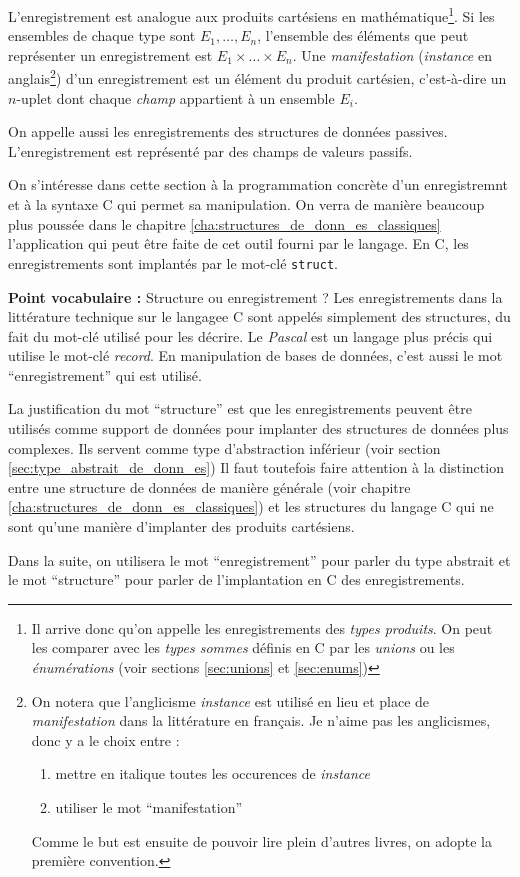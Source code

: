 \documentclass[../../../main.tex]{subfiles}
\begin{document}
L'enregistrement est analogue aux produits cartésiens en mathématique\footnote{Il arrive donc qu'on appelle les enregistrements des \textit{types produits}. On peut les comparer avec les \textit{types sommes} définis en C par les \textit{unions} ou les \textit{énumérations} (voir sections \ref{sec:unions} et \ref{sec:enums})}. Si les ensembles de chaque type sont $E_1, \dots, E_n$, l'ensemble des éléments que peut représenter un enregistrement est $E_1\times\dots\times E_n$. Une \textit{manifestation} (\textit{instance} en anglais\footnote{On notera que l'anglicisme \textit{instance} est utilisé en lieu et place de \textit{manifestation} dans la littérature en français. Je n'aime pas les anglicismes, donc y a le choix entre :
\begin{enumerate}
	\item mettre en italique toutes les occurences de \textit{instance}
	\item utiliser le mot ``manifestation''
\end{enumerate}
Comme le but est ensuite de pouvoir lire plein d'autres livres, on adopte la première convention.
}) d'un enregistrement est un élément du produit cartésien, c'est-à-dire un $n\text{-uplet}$ dont chaque \textit{champ} appartient à un ensemble $E_i$.

On appelle aussi les enregistrements des structures de données passives. L'enregistrement est représenté par des champs de valeurs passifs.

On s'intéresse dans cette section à la programmation concrète d'un enregistremnt et à la syntaxe C qui permet sa manipulation. On verra de manière beaucoup plus poussée dans le chapitre \ref{cha:structures_de_donn_es_classiques} l'application qui peut être faite de cet outil fourni par le langage. En C, les enregistrements sont implantés par le mot-clé \texttt{struct}.

\begin{minitelbasicbox}{\textbf{Point vocabulaire :} Structure ou enregistrement ?}
Les enregistrements dans la littérature technique sur le langagee C sont appelés simplement des structures, du fait du mot-clé utilisé pour les décrire. Le \textit{Pascal} est un langage plus précis qui utilise le mot-clé \textit{record}. En manipulation de bases de données, c'est aussi le mot ``enregistrement'' qui est utilisé.

La justification du mot ``structure'' est que les enregistrements peuvent être utilisés comme support de données pour implanter des structures de données plus complexes. Ils servent comme type d'abstraction inférieur (voir section \ref{sec:type_abstrait_de_donn_es}) Il faut toutefois faire attention à la distinction entre une structure de données de manière générale (voir chapitre \ref{cha:structures_de_donn_es_classiques}) et les structures du langage C qui ne sont qu'une manière d'implanter des produits cartésiens.

Dans la suite, on utilisera le mot ``enregistrement'' pour parler du type abstrait et le mot ``structure'' pour parler de l'implantation en C des enregistrements.
\end{minitelbasicbox}
\end{document}
